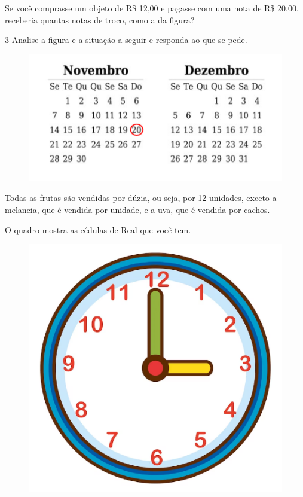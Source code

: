 Se você comprasse um objeto de R\$ 12,00 e pagasse com uma nota de R\$
20,00, receberia quantas notas de troco, como a da figura?


\num{3} Analise a figura e a situação a seguir e responda ao que se pede.



\begin{figure}[htpb!]
\centering
\includegraphics[width=.6\textwidth]{./media/image65.png}
\end{figure}

Todas as frutas são vendidas por dúzia, ou seja, por 12 unidades, exceto
a melancia, que é vendida por unidade, e a uva, que é vendida por cachos.

\pagebreak
O quadro mostra as cédulas de Real que você tem.

\begin{figure}[htpb!]
\includegraphics[width=\textwidth]{./media/image66.png}
\end{figure}

